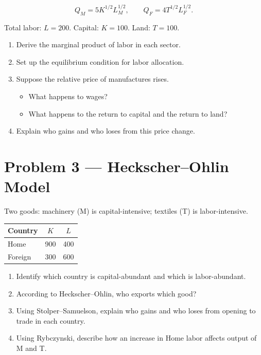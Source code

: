 \documentclass[12pt]{article}
\begin{document}
\[
Q_M = 5K^{1/2}L_M^{1/2}, \qquad Q_F = 4T^{1/2}L_F^{1/2}.
\]

Total labor: $L = 200$. Capital: $K = 100$. Land: $T = 100$.

\begin{enumerate}[label=(\arabic*)]
\item Derive the marginal product of labor in each sector.
\item Set up the equilibrium condition for labor allocation.
\item Suppose the relative price of manufactures rises.
    \begin{itemize}
        \item What happens to wages?
        \item What happens to the return to capital and the return to land?
    \end{itemize}
\item Explain who gains and who loses from this price change.
\end{enumerate}


\section*{Problem 3 — Heckscher--Ohlin Model}

Two goods: machinery (M) is capital-intensive; textiles (T) is labor-intensive.

\begin{center}
\begin{tabular}{lcc}
\toprule
Country & $K$ & $L$ \\
\midrule
Home & 900 & 400 \\
Foreign & 300 & 600 \\
\bottomrule
\end{tabular}
\end{center}

\begin{enumerate}[label=(\arabic*)]
\item Identify which country is capital-abundant and which is labor-abundant.
\item According to Heckscher--Ohlin, who exports which good?
\item Using Stolper--Samuelson, explain who gains and who loses from opening to trade in each country.
\item Using Rybczynski, describe how an increase in Home labor affects output of M and T.
\end{enumerate}
\end{document}
